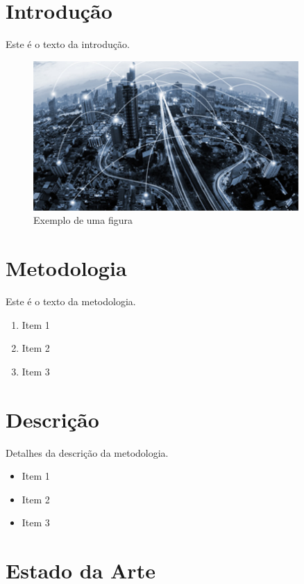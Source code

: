 \documentclass[12pt,a4paper,final]{article}
\begin{document}
    \section{Introdução}\label{sec:introducao}
    Este é o texto da introdução.

    \begin{figure}[h!]
        \centering
        \includegraphics[width=0.9\textwidth]{img_meitw}
        \caption{Exemplo de uma figura}
        \label{fig:exemplo}
    \end{figure}


    \section{Metodologia}\label{sec:metodologia}
    Este é o texto da metodologia.

    \begin{enumerate}
        \item Item 1
        \item Item 2
        \item Item 3
    \end{enumerate}


    \section{Descrição}\label{sec:descricao}
    Detalhes da descrição da metodologia.

    \begin{itemize}
        \item Item 1
        \item Item 2
        \item Item 3
    \end{itemize}


    \section{Estado da Arte}\label{sec:estado-da-arte}
\end{document}
